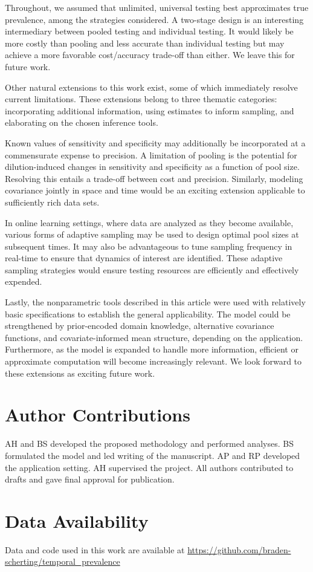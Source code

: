 \documentclass{article}
\begin{document}
Throughout, we assumed that unlimited, universal testing best approximates true prevalence, among the strategies considered. A two-stage design is an interesting intermediary between pooled testing and individual testing. It would likely be more costly than pooling and less accurate than individual testing but may achieve a more favorable cost/accuracy trade-off than either. We leave this for future work.

Other natural extensions to this work exist, some of which immediately resolve current limitations. These extensions belong to three thematic categories: incorporating additional information, using estimates to inform sampling, and elaborating on the chosen inference tools.

Known values of sensitivity and specificity may additionally be incorporated at a commensurate expense to precision. A limitation of pooling is the potential for dilution-induced changes in sensitivity and specificity as a function of pool size. Resolving this entails a trade-off between cost and precision. Similarly, modeling covariance jointly in space and time would be an exciting extension applicable to sufficiently rich data sets. 

In online learning settings, where data are analyzed as they become available, various forms of adaptive sampling may be used to design optimal pool sizes at subsequent times. It may also be advantageous to tune sampling frequency in real-time to ensure that dynamics of interest are identified. These adaptive sampling strategies would ensure testing resources are efficiently and effectively expended.

Lastly, the nonparametric tools described in this article were used with relatively basic specifications to establish the general applicability. The model could be strengthened by prior-encoded domain knowledge, alternative covariance functions, and covariate-informed mean structure, depending on the application. Furthermore, as the model is expanded to handle more information, efficient or approximate computation will become increasingly relevant. We look forward to these extensions as exciting future work. 

\section*{Author Contributions}
AH and BS developed the proposed methodology and performed analyses. BS formulated the model and led writing of the manuscript. AP and RP developed the application setting. AH supervised the project. All authors contributed to drafts and gave final approval for publication.

\section*{Data Availability}
Data and code used in this work are available at \url{https://github.com/braden-scherting/temporal_prevalence}



  
  
\end{document}
